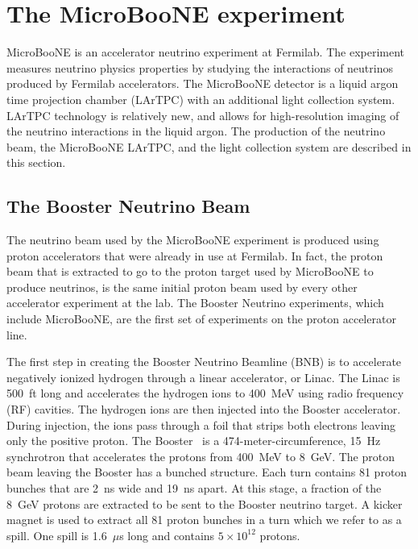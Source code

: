 \section{The MicroBooNE experiment}\label{microboone}
MicroBooNE is an accelerator neutrino experiment at Fermilab. The experiment
measures neutrino physics properties by studying the interactions of neutrinos
produced by Fermilab accelerators. The MicroBooNE detector is a liquid argon
time projection chamber (LArTPC) with an additional light collection system.
LArTPC technology is relatively new, and allows for high-resolution imaging of
the neutrino interactions in the liquid argon. The production of the neutrino
beam, the MicroBooNE LArTPC, and the light collection system are described in
this section.

\subsection{The Booster Neutrino Beam}\label{sec:beam}
  The neutrino beam used by the MicroBooNE experiment is produced using proton
  accelerators that were already in use at Fermilab. In fact, the proton beam
  that is extracted to go to the proton target used by MicroBooNE to produce
  neutrinos, is the same initial proton beam used by every other accelerator
  experiment at the lab. The Booster Neutrino experiments, which include
  MicroBooNE, are the first set of experiments on the proton accelerator line.

  The first step in creating the Booster Neutrino Beamline (BNB) is to
  accelerate negatively ionized hydrogen through a linear accelerator, or
  Linac. The Linac is 500~ft long and accelerates the hydrogen ions to
  400~MeV using radio frequency (RF) cavities. The hydrogen ions are then
  injected into the Booster accelerator. During injection, the ions pass
  through a foil that strips both electrons leaving only the positive proton.
  The Booster~\cite{AguilarArevalo:2008yp} is a 474-meter-circumference, 15~Hz
  synchrotron that accelerates the protons from 400~MeV to 8~GeV. The proton
  beam leaving the Booster has a bunched structure. Each turn contains 81
  proton bunches that are 2~ns wide and 19~ns apart. At this stage, a
  fraction of the 8~GeV protons are extracted to be sent to the Booster
  neutrino target. A kicker magnet is used to extract all 81 proton bunches
  in a turn which we refer to as a spill. One spill is 1.6~$\mu$s long and
  contains $5\times 10^{12}$ protons.


